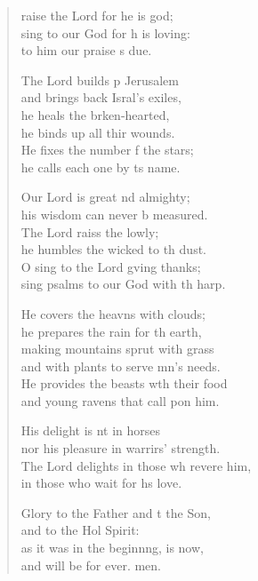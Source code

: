 \settowidth{\versewidth}{The Lord delights in those who revere him, *}
\begin{verse}%
  \begin{patverse}
raise the Lord for he is god;\Flex\\
sing to our God for h is loving:\Med\\
to him our praise \pointup{\i}s due.

The Lord builds p Jerusalem\Med\\
and brings back Isral’s exiles,\\
he heals the brken-hearted,\Med\\
he binds up all thir wounds.\\
He fixes the number f the stars;\Med\\
he calls each one by \pointup{\i}ts name.

Our Lord is great nd almighty;\Med\\
his wisdom can never b measured.\\
The Lord raiss the lowly;\Med\\
he humbles the wicked to th dust.\\
O sing to the Lord g\pointup{\i}ving thanks;\Med\\
sing psalms to our God with th harp.

He covers the heavns with clouds;\Med\\
he prepares the rain for th earth,\\
making mountains sprut with grass\Med\\
and with plants to serve mn’s needs.\\
He provides the beasts w\pointup{\i}th their food\Med\\
and young ravens that call pon him.

His delight is nt in horses\Med\\
nor his pleasure in warrirs’ strength.\\
The Lord delights in those wh revere him,\Med\\
in those who wait for h\pointup{\i}s love.

Glory to the Father and t the Son,\Med\\
and to the Hol Spirit:\\
as it was in the beginn\pointup{\i}ng, is now,\Med\\
and will be for ever. men.
  \end{patverse}
  \end{verse}
